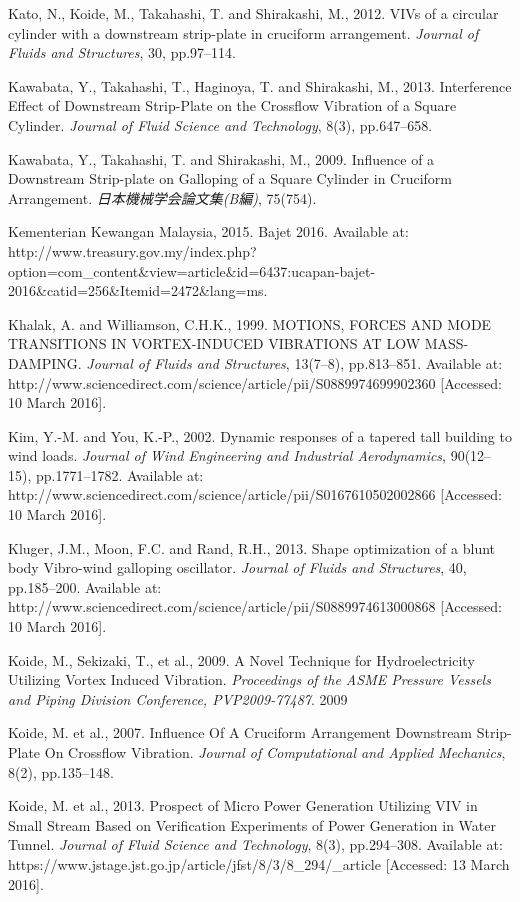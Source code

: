 \documentclass[]{article}
\begin{document}
Kato, N., Koide, M., Takahashi, T. and Shirakashi, M., 2012. VIVs of a
circular cylinder with a downstream strip-plate in cruciform
arrangement. \emph{Journal of Fluids and Structures}, 30, pp.97--114.

Kawabata, Y., Takahashi, T., Haginoya, T. and Shirakashi, M., 2013.
Interference Effect of Downstream Strip-Plate on the Crossflow Vibration
of a Square Cylinder. \emph{Journal of Fluid Science and Technology},
8(3), pp.647--658.

Kawabata, Y., Takahashi, T. and Shirakashi, M., 2009. Influence of a
Downstream Strip-plate on Galloping of a Square Cylinder in Cruciform
Arrangement. \emph{日本機械学会論文集(B編)}, 75(754).

Kementerian Kewangan Malaysia, 2015. Bajet 2016. Available at:
http://www.treasury.gov.my/index.php?option=com\_content\&view=article\&id=6437:ucapan-bajet-2016\&catid=256\&Itemid=2472\&lang=ms.

Khalak, A. and Williamson, C.H.K., 1999. MOTIONS, FORCES AND MODE
TRANSITIONS IN VORTEX-INDUCED VIBRATIONS AT LOW MASS-DAMPING.
\emph{Journal of Fluids and Structures}, 13(7--8), pp.813--851.
Available at:
http://www.sciencedirect.com/science/article/pii/S0889974699902360
{[}Accessed: 10 March 2016{]}.

Kim, Y.-M. and You, K.-P., 2002. Dynamic responses of a tapered tall
building to wind loads. \emph{Journal of Wind Engineering and Industrial
Aerodynamics}, 90(12--15), pp.1771--1782. Available at:
http://www.sciencedirect.com/science/article/pii/S0167610502002866
{[}Accessed: 10 March 2016{]}.

Kluger, J.M., Moon, F.C. and Rand, R.H., 2013. Shape optimization of a
blunt body Vibro-wind galloping oscillator. \emph{Journal of Fluids and
Structures}, 40, pp.185--200. Available at:
http://www.sciencedirect.com/science/article/pii/S0889974613000868
{[}Accessed: 10 March 2016{]}.

Koide, M., Sekizaki, T., et al., 2009. A Novel Technique for
Hydroelectricity Utilizing Vortex Induced Vibration. \emph{Proceedings
of the ASME Pressure Vessels and Piping Division Conference,
PVP2009-77487}. 2009

Koide, M. et al., 2007. Influence Of A Cruciform Arrangement Downstream
Strip-Plate On Crossflow Vibration. \emph{Journal of Computational and
Applied Mechanics}, 8(2), pp.135--148.

Koide, M. et al., 2013. Prospect of Micro Power Generation Utilizing VIV
in Small Stream Based on Verification Experiments of Power Generation in
Water Tunnel. \emph{Journal of Fluid Science and Technology}, 8(3),
pp.294--308. Available at:
https://www.jstage.jst.go.jp/article/jfst/8/3/8\_294/\_article
{[}Accessed: 13 March 2016{]}.
\end{document}

